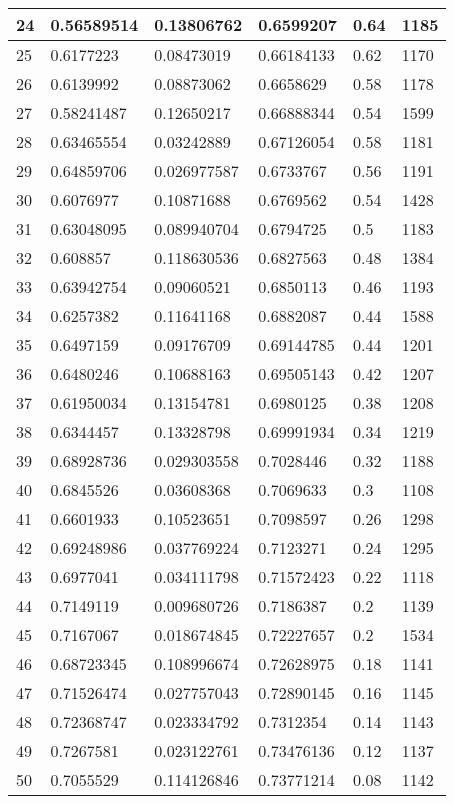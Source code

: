 \begin{longtable}{|l|l|l|l|l|l|}
24 & 0.56589514 & 0.13806762 & 0.6599207 & 0.64 & 1185 \\ \hline 
25 & 0.6177223 & 0.08473019 & 0.66184133 & 0.62 & 1170 \\ \hline 
26 & 0.6139992 & 0.08873062 & 0.6658629 & 0.58 & 1178 \\ \hline 
27 & 0.58241487 & 0.12650217 & 0.66888344 & 0.54 & 1599 \\ \hline 
28 & 0.63465554 & 0.03242889 & 0.67126054 & 0.58 & 1181 \\ \hline 
29 & 0.64859706 & 0.026977587 & 0.6733767 & 0.56 & 1191 \\ \hline 
30 & 0.6076977 & 0.10871688 & 0.6769562 & 0.54 & 1428 \\ \hline 
31 & 0.63048095 & 0.089940704 & 0.6794725 & 0.5 & 1183 \\ \hline 
32 & 0.608857 & 0.118630536 & 0.6827563 & 0.48 & 1384 \\ \hline 
33 & 0.63942754 & 0.09060521 & 0.6850113 & 0.46 & 1193 \\ \hline 
34 & 0.6257382 & 0.11641168 & 0.6882087 & 0.44 & 1588 \\ \hline 
35 & 0.6497159 & 0.09176709 & 0.69144785 & 0.44 & 1201 \\ \hline 
36 & 0.6480246 & 0.10688163 & 0.69505143 & 0.42 & 1207 \\ \hline 
37 & 0.61950034 & 0.13154781 & 0.6980125 & 0.38 & 1208 \\ \hline 
38 & 0.6344457 & 0.13328798 & 0.69991934 & 0.34 & 1219 \\ \hline 
39 & 0.68928736 & 0.029303558 & 0.7028446 & 0.32 & 1188 \\ \hline 
40 & 0.6845526 & 0.03608368 & 0.7069633 & 0.3 & 1108 \\ \hline 
41 & 0.6601933 & 0.10523651 & 0.7098597 & 0.26 & 1298 \\ \hline 
42 & 0.69248986 & 0.037769224 & 0.7123271 & 0.24 & 1295 \\ \hline 
43 & 0.6977041 & 0.034111798 & 0.71572423 & 0.22 & 1118 \\ \hline 
44 & 0.7149119 & 0.009680726 & 0.7186387 & 0.2 & 1139 \\ \hline 
45 & 0.7167067 & 0.018674845 & 0.72227657 & 0.2 & 1534 \\ \hline 
46 & 0.68723345 & 0.108996674 & 0.72628975 & 0.18 & 1141 \\ \hline 
47 & 0.71526474 & 0.027757043 & 0.72890145 & 0.16 & 1145 \\ \hline 
48 & 0.72368747 & 0.023334792 & 0.7312354 & 0.14 & 1143 \\ \hline 
49 & 0.7267581 & 0.023122761 & 0.73476136 & 0.12 & 1137 \\ \hline 
50 & 0.7055529 & 0.114126846 & 0.73771214 & 0.08 & 1142 \\ \hline 
\end{longtable}